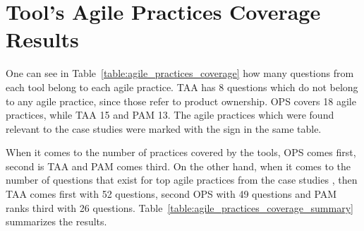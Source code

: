 \section{Tool's Agile Practices Coverage Results}
\label{sec:coverage_results}
One can see in Table~\ref{table:agile_practices_coverage} how many questions from each tool belong to each agile practice. \ac{TAA} has 8 questions which do not belong to any agile practice, since those refer to product ownership. \ac{OPS} covers 18 agile practices, while \ac{TAA} 15 and \ac{PAM} 13. The agile practices which were found relevant to the case studies \cite{Williams_Microsoft, laurie_williams} were marked with the sign \CrossMaltese in the same table.

When it comes to the number of practices covered by the tools, \ac{OPS} comes first, second is \ac{TAA} and \ac{PAM} comes third. On the other hand, when it comes to the number of questions that exist for top agile practices from the case studies \cite{Williams_Microsoft, laurie_williams}, then \ac{TAA} comes first with 52 questions, second \ac{OPS} with 49 questions and \ac{PAM} ranks third with 26 questions. Table~\ref{table:agile_practices_coverage_summary} summarizes the results.

